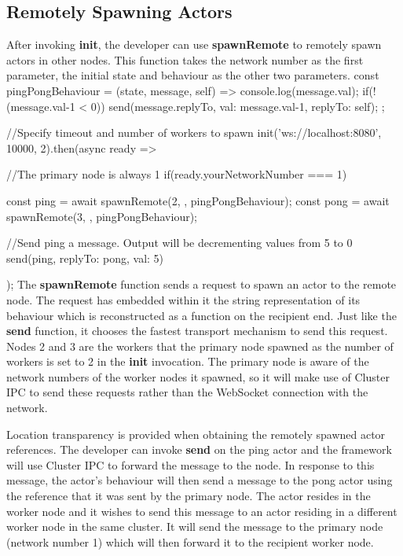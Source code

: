\documentclass[12pt, a4paper]{report}
\newenvironment{code}
{\footnotesize\verbatim}{\endverbatim\normalfont}
\theoremstyle{definition}
\theoremstyle{definition}%
\theoremstyle{definition}%
\theoremstyle{definition}%
\theoremstyle{definition}%
\theoremstyle{definition}%
\begin{document}
\subsection{Remotely Spawning Actors}
After invoking \textbf{init}, the developer can use \textbf{spawnRemote} to remotely spawn actors in other nodes. This function takes the network number as the first parameter, the initial state and behaviour as the other two parameters.
\begin{code}
const pingPongBehaviour = (state, message, self) => {
    console.log(message.val);
    if(!(message.val-1 < 0))
        send(message.replyTo, {val: message.val-1, replyTo: self});
};

//Specify timeout and number of workers to spawn
init('ws://localhost:8080', 10000, 2).then(async ready => {
    //The primary node is always 1
    if(ready.yourNetworkNumber === 1){
        const ping = await spawnRemote(2, {}, pingPongBehaviour);
        const pong = await spawnRemote(3, {}, pingPongBehaviour);

        //Send ping a message. Output will be decrementing values from 5 to 0
        send(ping, {replyTo: pong, val: 5})
    }
});
\end{code}
The \textbf{spawnRemote} function sends a request to spawn an actor to the remote node. The request has embedded within it the string representation of its behaviour which is reconstructed as a function on the recipient end. Just like the \textbf{send} function, it chooses the fastest transport mechanism to send this request. Nodes 2 and 3 are the workers that the primary node spawned as the number of workers is set to 2 in the \textbf{init} invocation. The primary node is aware of the network numbers of the worker nodes it spawned, so it will make use of Cluster IPC to send these requests rather than the WebSocket connection with the network.

Location transparency is provided when obtaining the remotely spawned actor references. The developer can invoke \textbf{send} on the ping actor and the framework will use Cluster IPC to forward the message to the node. In response to this message, the actor's behaviour will then send a message to the pong actor using the reference that it was sent by the primary node. The actor resides in the worker node and it wishes to send this message to an actor residing in a different worker node in the same cluster. It will send the message to the primary node (network number 1) which will then forward it to the recipient worker node.
\end{document}
